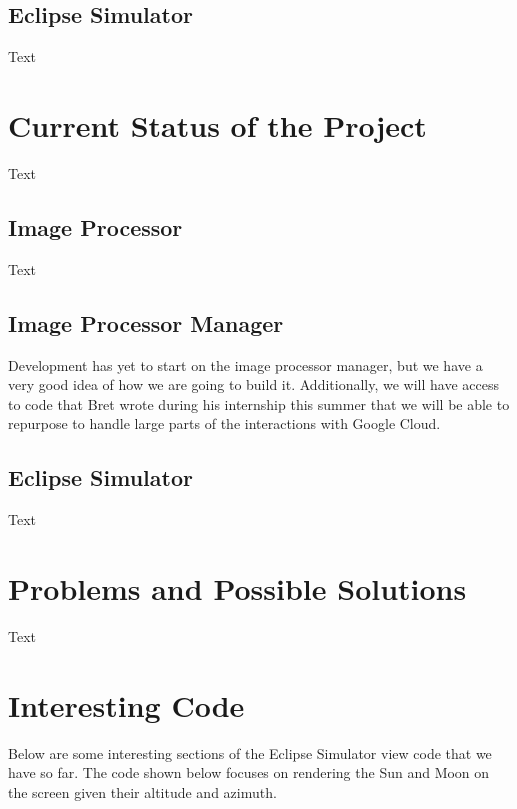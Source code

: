 \documentclass[10pt, onecolumn, draftclsnofoot, letterpaper, compsoc]{IEEEtran}
\begin{document}
\subsection{Eclipse Simulator}

Text


\section{Current Status of the Project}

Text

\subsection{Image Processor}

Text

\subsection{Image Processor Manager}

Development has yet to start on the image processor manager, but we have a very good idea of how we 
are going to build it. Additionally, we will have access to code that Bret wrote during his internship 
this summer that we will be able to repurpose to handle large parts of the interactions with Google Cloud.

\subsection{Eclipse Simulator}

Text

\section{Problems and Possible Solutions}

Text

\section{Interesting Code}

Below are some interesting sections of the Eclipse Simulator view code that we have so far. 
The code shown below focuses on rendering the Sun and Moon on the screen given their
altitude and azimuth. \\
\end{document}
